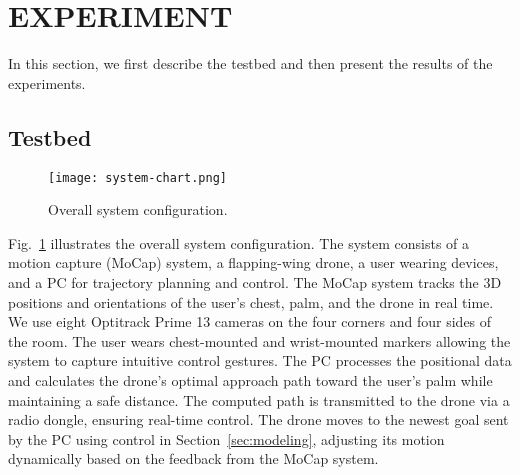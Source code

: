 \section{EXPERIMENT}
In this section, we first describe the testbed and then present the results of the experiments.

\subsection{Testbed}

\begin{figure}[t]
  \centering
  \texttt{[image: system-chart.png]}
  \caption{Overall system configuration.}
  \label{fig:system}
\end{figure}
Fig.~\ref{fig:system} illustrates the overall system configuration.
The system consists of a motion capture (MoCap) system, a flapping-wing drone, a user wearing devices, and a PC for trajectory planning and control.
The MoCap system tracks the 3D positions and orientations of the user's chest, palm, and the drone in real time.
We use eight Optitrack Prime 13 cameras on the four corners and four sides of the room.  
The user wears chest-mounted and wrist-mounted markers allowing the system to capture intuitive control gestures. 
The PC processes the positional data and calculates the drone's optimal approach path toward the user's palm while maintaining a safe distance. 
The computed path is transmitted to the drone via a radio dongle, ensuring real-time control. 
The drone moves to the newest goal sent by the PC using control in Section~\ref{sec:modeling}, 
adjusting its motion dynamically based on the feedback from the MoCap system.

